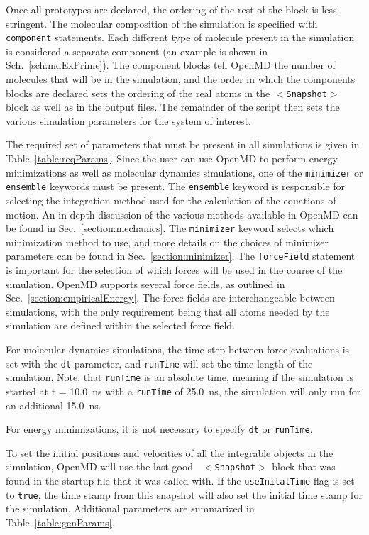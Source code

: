 \documentclass[]{book}
\begin{document}
Once all prototypes are declared, the ordering of the rest of the
block is less stringent.  The molecular composition of the simulation
is specified with {\tt component} statements. Each different type of
molecule present in the simulation is considered a separate
component (an example is shown in
Sch.~\ref{sch:mdExPrime}).  The component blocks tell {\sc OpenMD} the
number of molecules that will be in the simulation, and the order in
which the components blocks are declared sets the ordering of the real
atoms in the {\tt $<$Snapshot$>$} block as well as in the output files. The
remainder of the script then sets the various simulation parameters
for the system of interest.

The required set of parameters that must be present in all simulations
is given in Table~\ref{table:reqParams}.  Since the user can use {\sc
OpenMD} to perform energy minimizations as well as molecular dynamics
simulations, one of the {\tt minimizer} or {\tt ensemble} keywords
must be present.  The {\tt ensemble} keyword is responsible for
selecting the integration method used for the calculation of the
equations of motion. An in depth discussion of the various methods
available in {\sc OpenMD} can be found in
Sec.~\ref{section:mechanics}.  The {\tt minimizer} keyword selects
which minimization method to use, and more details on the choices of
minimizer parameters can be found in
Sec.~\ref{section:minimizer}. The {\tt forceField} statement is
important for the selection of which forces will be used in the course
of the simulation. {\sc OpenMD} supports several force fields, as
outlined in Sec.~\ref{section:empiricalEnergy}. The force fields are
interchangeable between simulations, with the only requirement being
that all atoms needed by the simulation are defined within the
selected force field. 

For molecular dynamics simulations, the time step between force
evaluations is set with the {\tt dt} parameter, and {\tt runTime} will
set the time length of the simulation. Note, that {\tt runTime} is an
absolute time, meaning if the simulation is started at t = 10.0~ns
with a {\tt runTime} of 25.0~ns, the simulation will only run for an
additional 15.0~ns.  

For energy minimizations, it is not necessary to specify {\tt dt} or
{\tt runTime}.

To set the initial positions and velocities of all the integrable
objects in the simulation, {\sc OpenMD} will use the last good {\tt
$<$Snapshot$>$} block that was found in the startup file that it was
called with.  If the {\tt useInitalTime} flag is set to {\tt true},
the time stamp from this snapshot will also set the initial time stamp
for the simulation.  Additional parameters are summarized in
Table~\ref{table:genParams}.
\end{document}
